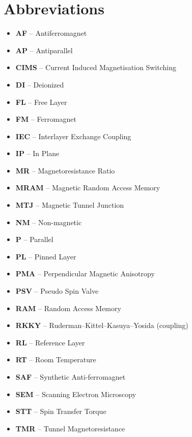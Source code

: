 \section{Abbreviations}
\begin{itemize}
    \item    \textbf{AF}      --    Antiferromagnet
    \item    \textbf{AP}      --    Antiparallel
	\item    \textbf{CIMS}    --    Current Induced Magnetisation Switching
	\item    \textbf{DI}      --    Deionized
	\item    \textbf{FL}      --    Free Layer
	\item    \textbf{FM}      --    Ferromagnet
	\item    \textbf{IEC}     --    Interlayer Exchange Coupling
	\item    \textbf{IP}      --    In Plane
	\item    \textbf{MR}      --    Magnetoresistance Ratio
    \item    \textbf{MRAM}    --    Magnetic Random Access Memory
    \item    \textbf{MTJ}     --    Magnetic Tunnel Junction
    \item    \textbf{NM}      --    Non-magnetic
    \item    \textbf{P}       --    Parallel
    \item    \textbf{PL}      --    Pinned Layer
    \item    \textbf{PMA}     --    Perpendicular Magnetic Anisotropy
    \item    \textbf{PSV}     --    Pseudo Spin Valve
    \item    \textbf{RAM}     --    Random Access Memory
    \item    \textbf{RKKY}    --    Ruderman–Kittel–Kasuya–Yosida (coupling)
    \item    \textbf{RL}      --    Reference Layer
    \item    \textbf{RT}      --    Room Temperature
    \item    \textbf{SAF}     --    Synthetic Anti-ferromagnet
    \item    \textbf{SEM}     --    Scanning Electron Microscopy
    \item    \textbf{STT}     --    Spin Transfer Torque
    \item    \textbf{TMR}     --    Tunnel Magnetoresistance
\end{itemize}
